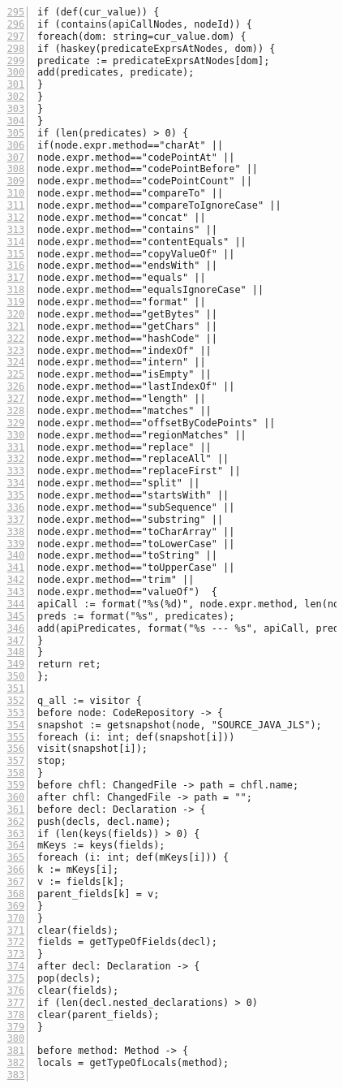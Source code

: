 \begin{figure}[ht!]
\begin{lstlisting}[numbers=left, tabsize=4, escapechar=@, caption={API Precondition Mining Analysis},label={lst:apm-code}, firstline = 295, firstnumber = 295, lastline = 355]
if (def(cur_value)) {
if (contains(apiCallNodes, nodeId)) {
foreach(dom: string=cur_value.dom) {
if (haskey(predicateExprsAtNodes, dom)) {
predicate := predicateExprsAtNodes[dom];
add(predicates, predicate);
}
}
}
}
if (len(predicates) > 0) {
if(node.expr.method=="charAt" ||  
node.expr.method=="codePointAt" || 
node.expr.method=="codePointBefore" || 
node.expr.method=="codePointCount" || 
node.expr.method=="compareTo" || 
node.expr.method=="compareToIgnoreCase" || 
node.expr.method=="concat" || 
node.expr.method=="contains" || 
node.expr.method=="contentEquals" || 
node.expr.method=="copyValueOf" || 
node.expr.method=="endsWith" || 
node.expr.method=="equals" || 
node.expr.method=="equalsIgnoreCase" || 
node.expr.method=="format" || 
node.expr.method=="getBytes" || 
node.expr.method=="getChars" || 
node.expr.method=="hashCode" || 
node.expr.method=="indexOf" || 
node.expr.method=="intern" || 
node.expr.method=="isEmpty" || 
node.expr.method=="lastIndexOf" || 
node.expr.method=="length" || 
node.expr.method=="matches" || 
node.expr.method=="offsetByCodePoints" || 
node.expr.method=="regionMatches" || 
node.expr.method=="replace" || 
node.expr.method=="replaceAll" || 
node.expr.method=="replaceFirst" || 
node.expr.method=="split" ||  
node.expr.method=="startsWith" ||  
node.expr.method=="subSequence" || 
node.expr.method=="substring" || 
node.expr.method=="toCharArray" || 
node.expr.method=="toLowerCase" || 
node.expr.method=="toString" || 
node.expr.method=="toUpperCase" || 
node.expr.method=="trim" || 
node.expr.method=="valueOf")  {
apiCall := format("%s(%d)", node.expr.method, len(node.expr.method_args));
preds := format("%s", predicates);
add(apiPredicates, format("%s --- %s", apiCall, preds));
}
}
return ret;
};

q_all := visitor {
before node: CodeRepository -> {
snapshot := getsnapshot(node, "SOURCE_JAVA_JLS");
foreach (i: int; def(snapshot[i]))
visit(snapshot[i]);
stop;
}
before chfl: ChangedFile -> path = chfl.name;
after chfl: ChangedFile -> path = "";
before decl: Declaration -> {
push(decls, decl.name);
if (len(keys(fields)) > 0) {
mKeys := keys(fields);    
foreach (i: int; def(mKeys[i])) {
k := mKeys[i];
v := fields[k];
parent_fields[k] = v;
}
}
clear(fields);
fields = getTypeOfFields(decl);
}
after decl: Declaration -> {
pop(decls);
clear(fields);
if (len(decl.nested_declarations) > 0)
clear(parent_fields);
}

before method: Method -> {
locals = getTypeOfLocals(method);


\end{lstlisting}
\end{figure}
